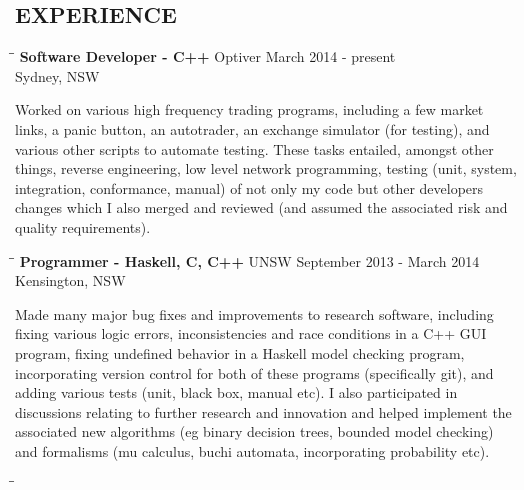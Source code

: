 \documentclass{res}
\begin{document}
\begin{resume}
\section{EXPERIENCE}
   \vspace{-0.1in}	
   \begin{tabbing}
   \hspace{2.3in}\= \hspace{2.6in}\= \kill %
    {\bf Software Developer - C++} \>Optiver \>March 2014 - present\\
                             \>Sydney, NSW
   \end{tabbing}\vspace{-20pt}      %
    Worked on various high frequency trading programs, including a few market
    links, a panic button, an autotrader, an exchange simulator (for testing),
    and various other scripts to automate testing. These tasks entailed,
    amongst other things, reverse engineering, low level network programming,
    testing (unit, system, integration, conformance, manual) of not only my
    code but other developers changes which I also merged and reviewed (and
    assumed the associated risk and quality requirements).
   \begin{tabbing}
   \hspace{2.3in}\= \hspace{2.6in}\= \kill %
    {\bf Programmer - Haskell, C, C++} \>UNSW \>September 2013 - March 2014\\
                     \>Kensington, NSW
   \end{tabbing}\vspace{-20pt}      %
    Made many major bug fixes and improvements to research software, including
    fixing various logic errors, inconsistencies and race conditions in a C++
    GUI program, fixing undefined behavior in a Haskell model checking program,
    incorporating version control for both of these programs (specifically
    git), and adding various tests (unit, black box, manual etc). I also
    participated in discussions relating to further research and innovation and
    helped implement the associated new algorithms (eg binary decision trees,
    bounded model checking) and formalisms (mu calculus, buchi automata,
    incorporating probability etc).
   \begin{tabbing}
   \hspace{2.3in}\= \hspace{2.6in}\= \kill %

\end{tabbing}
\end{resume}
\end{document}
